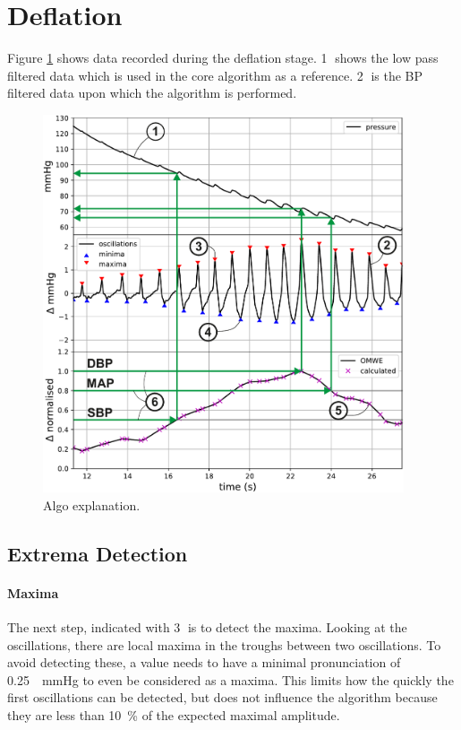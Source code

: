 \section{Deflation}\label{sec:Deflation}
Figure \ref{fig:algoExplain} shows data recorded during the deflation stage. \textcircled{1} shows the low pass filtered data which is used in the core algorithm as a reference. \textcircled{2} is the BP filtered data upon which the algorithm is performed. 

\begin{figure}[ht]
\centering
\includegraphics[width=0.95\textwidth]{figures/algorithm_example_annotated.pdf}
\caption{Algo explanation.}
\label{fig:algoExplain}
\end{figure}



\subsection{Extrema Detection}
\paragraph{Maxima}The next step, indicated with \textcircled{3} is to detect the maxima. Looking at the oscillations, there are local maxima in the troughs between two oscillations. To avoid detecting these, a value needs to have a minimal pronunciation of \SI{0.25}{\Delta\mmHg} to even be considered as a maxima. This limits how the quickly the first oscillations can be detected, but does not influence the algorithm because they are less than \SI{10}{\percent} of the expected maximal amplitude.

